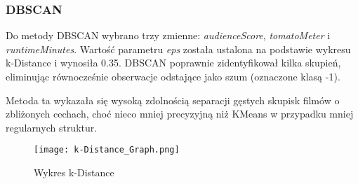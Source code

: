\documentclass[a4paper,12pt,titlepage]{article}
\begin{document}
\subsubsection{DBSCAN}

Do metody DBSCAN wybrano trzy zmienne: \textit{audienceScore}, \textit{tomatoMeter} i \textit{runtimeMinutes}. Wartość parametru \textit{eps} została ustalona na podstawie wykresu k-Distance i wynosiła 0.35. DBSCAN poprawnie zidentyfikował kilka skupień, eliminując równocześnie obserwacje odstające jako szum (oznaczone klasą -1). 

Metoda ta wykazała się wysoką zdolnością separacji gęstych skupisk filmów o zbliżonych cechach, choć nieco mniej precyzyjną niż KMeans w przypadku mniej regularnych struktur.
\begin{figure}[H]
\centering
\texttt{[image: k-Distance\_Graph.png]}
\caption{Wykres k-Distance}
\end{figure}
\end{document}
